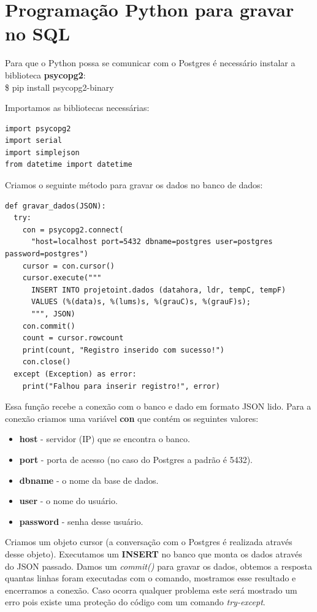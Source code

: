 \documentclass[a4paper,11pt]{article}
\begin{document}
\section*{Programação Python para gravar no SQL}
Para que o Python possa se comunicar com o Postgres é necessário instalar a biblioteca \textbf{psycopg2}: \\
{\ttfamily\$ pip install psycopg2-binary}

Importamos as bibliotecas necessárias:
\begin{lstlisting}[]
import psycopg2
import serial
import simplejson
from datetime import datetime
\end{lstlisting}

Criamos o seguinte método para gravar os dados no banco de dados:
\begin{lstlisting}[]
def gravar_dados(JSON):
  try:
    con = psycopg2.connect(
      "host=localhost port=5432 dbname=postgres user=postgres password=postgres")
    cursor = con.cursor()
    cursor.execute("""
      INSERT INTO projetoint.dados (datahora, ldr, tempC, tempF)
      VALUES (%(data)s, %(lums)s, %(grauC)s, %(grauF)s);
      """, JSON)
    con.commit()
    count = cursor.rowcount
    print(count, "Registro inserido com sucesso!")
    con.close()
  except (Exception) as error:
    print("Falhou para inserir registro!", error)
\end{lstlisting}

Essa função recebe a conexão com o banco e dado em formato JSON lido. Para a conexão criamos uma variável \textbf{con} que contém os seguintes valores: \vspace{-1em}
\begin{itemize}[nolistsep]
	\item \textbf{host} - servidor (IP) que se encontra o banco.
	\item \textbf{port} - porta de acesso (no caso do Postgres a padrão é 5432).
	\item \textbf{dbname} - o nome da base de dados.
	\item \textbf{user} - o nome do usuário.
	\item \textbf{password} - senha desse usuário.
\end{itemize}

Criamos um objeto cursor (a conversação com o Postgres é realizada através desse objeto). Executamos um \textbf{INSERT} no banco que monta os dados através do JSON passado. Damos um \textit{commit()} para gravar os dados, obtemos a resposta quantas linhas foram executadas com o comando, mostramos esse resultado e encerramos a conexão. Caso ocorra qualquer problema este será mostrado um erro pois existe uma proteção do código com um comando \textit{try-except}.
\end{document}
